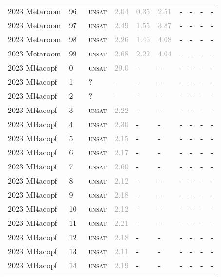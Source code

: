 \begin{center}
{\begin{longtable}{@{}llllllllll@{}}
2023 Metaroom & 96 & ~\textsc{unsat} & \textcolor{darkgray}{2.04} & \textcolor{darkgray}{0.35} & \textcolor{darkgray}{2.51} & - & - & - & - \\
2023 Metaroom & 97 & ~\textsc{unsat} & \textcolor{darkgray}{2.49} & \textcolor{darkgray}{1.55} & \textcolor{darkgray}{3.87} & - & - & - & - \\
2023 Metaroom & 98 & ~\textsc{unsat} & \textcolor{darkgray}{2.26} & \textcolor{darkgray}{1.46} & \textcolor{darkgray}{4.08} & - & - & - & - \\
2023 Metaroom & 99 & ~\textsc{unsat} & \textcolor{darkgray}{2.68} & \textcolor{darkgray}{2.22} & \textcolor{darkgray}{4.04} & - & - & - & - \\
\midrule
2023 Ml4acopf & 0 & ~\textsc{unsat} & \textcolor{darkgray}{29.0} & - & - & - & - & - & - \\
2023 Ml4acopf & 1 & ~? & - & - & - & - & - & - & - \\
2023 Ml4acopf & 2 & ~? & - & - & - & - & - & - & - \\
2023 Ml4acopf & 3 & ~\textsc{unsat} & \textcolor{darkgray}{2.22} & - & - & - & - & - & - \\
2023 Ml4acopf & 4 & ~\textsc{unsat} & \textcolor{darkgray}{2.30} & - & - & - & - & - & - \\
2023 Ml4acopf & 5 & ~\textsc{unsat} & \textcolor{darkgray}{2.15} & - & - & - & - & - & - \\
2023 Ml4acopf & 6 & ~\textsc{unsat} & \textcolor{darkgray}{2.17} & - & - & - & - & - & - \\
2023 Ml4acopf & 7 & ~\textsc{unsat} & \textcolor{darkgray}{2.60} & - & - & - & - & - & - \\
2023 Ml4acopf & 8 & ~\textsc{unsat} & \textcolor{darkgray}{2.12} & - & - & - & - & - & - \\
2023 Ml4acopf & 9 & ~\textsc{unsat} & \textcolor{darkgray}{2.18} & - & - & - & - & - & - \\
2023 Ml4acopf & 10 & ~\textsc{unsat} & \textcolor{darkgray}{2.12} & - & - & - & - & - & - \\
2023 Ml4acopf & 11 & ~\textsc{unsat} & \textcolor{darkgray}{2.21} & - & - & - & - & - & - \\
2023 Ml4acopf & 12 & ~\textsc{unsat} & \textcolor{darkgray}{2.18} & - & - & - & - & - & - \\
2023 Ml4acopf & 13 & ~\textsc{unsat} & \textcolor{darkgray}{2.11} & - & - & - & - & - & - \\
2023 Ml4acopf & 14 & ~\textsc{unsat} & \textcolor{darkgray}{2.19} & - & - & - & - & - & - \\

\end{longtable}}
\end{center}
